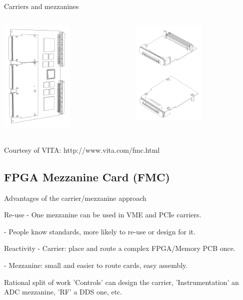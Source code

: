 \documentclass[compress,red]{beamer}
\begin{document}
\begin{frame}{Carriers and mezzanines}
 \begin{columns}
 \begin{column}{5cm}
  \begin{center}
   \includegraphics[width=3.5cm]{carrier.png}%
  \end{center}
 \end{column}
 \begin{column}{5cm}
  \begin{center}
   \includegraphics[width=3.5cm]{single_width1.png}%
  \end{center}
 \end{column}
 \end{columns}
 Courtesy of VITA: http://www.vita.com/fmc.html
\end{frame}

\subsection{FPGA Mezzanine Card (FMC)}

\begin{frame}{Advantages of the carrier/mezzanine approach}
	\begin{block}{Re-use}
		- One mezzanine can be used in VME and PCIe carriers.

		- People know standards, more likely to re-use or design for it.
	\end{block}
	\begin{block}{Reactivity}
	    - Carrier: place and route a complex FPGA/Memory PCB once.

	- Mezzanine: small and easier to route cards, easy assembly.
	\end{block}
	\begin{block}{Rational split of work}
	    'Controls' can design the carrier, 'Instrumentation' an ADC mezzanine, 'RF' a DDS one, etc.
	\end{block}
\end{frame}
\end{document}
